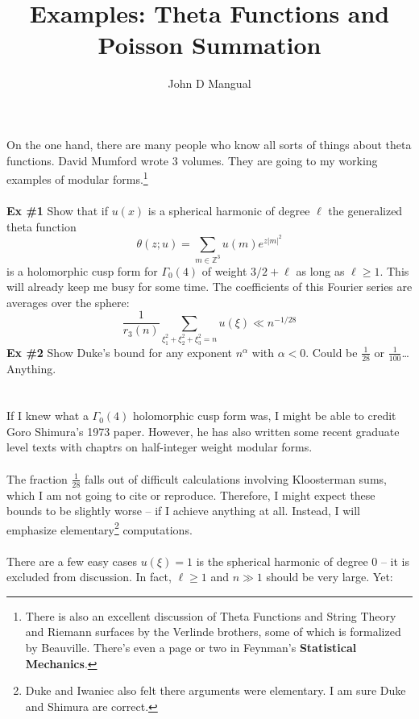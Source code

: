\documentclass[12pt]{article}
\title{\textbf{ Examples: Theta Functions and Poisson Summation}}
\author{John D Mangual}
\date{}
\begin{document}
\selectfont \fontsize{25}{30}\selectfont

\maketitle

\selectfont \fontsize{12}{10}\selectfont

\noindent On the one hand, there are many people who know all sorts of things about theta functions.  David Mumford wrote 3 volumes.  They are going to my working examples of modular forms.\footnote{There is also an excellent discussion of Theta Functions and String Theory and Riemann surfaces by the Verlinde brothers, some of which is formalized by Beauville.  There's even a page or two in Feynman's \textbf{Statistical Mechanics}. } \\ \\
\textbf{Ex \#1} Show that if $u(x)$ is a spherical harmonic of degree $\ell$ the generalized theta function
$$ \theta(z; u) = \sum_{m \in \mathbb{Z}^3} u(m) e^{z|m|^2} $$
is a holomorphic cusp form for $\Gamma_0(4)$ of weight $3/2 + \ell$ as long as $\ell \geq 1$.  This will already keep me busy for some time.  The coefficients of this Fourier series are averages over the sphere:
$$  \frac{1}{r_3(n)} \sum_{\xi_1^2 + \xi_2^2 + \xi_3^2 = n} u(\xi) \ll   n^{- 1/28}$$
\textbf{Ex \#2} Show Duke's bound for any exponent $n^\alpha$ with $\alpha < 0$.  Could be $\frac{1}{28}$ or $\frac{1}{100}$\dots Anything.  \\ \\ \\
If I knew what a $\Gamma_0(4)$ holomorphic cusp form was, I might be able to credit Goro Shimura's 1973 paper.  However, he has also written some recent graduate level texts with chaptrs on half-integer weight modular forms.  \\ \\ 
The fraction $\frac{1}{28}$ falls out of difficult calculations involving Kloosterman sums, which I am not going to cite or reproduce.  Therefore, I might expect these bounds to be slightly worse -- if I achieve anything at all.   Instead, I will emphasize elementary\footnote{Duke and Iwaniec also felt there arguments were elementary.  I am sure Duke and Shimura are correct.} computations.\\ \\ 
There are a few easy cases $u(\xi) = 1$ is the spherical harmonic of degree 0 -- it is excluded from discussion.  In fact, $\ell \geq 1$ and $n \gg 1$ should be very large.  Yet:
\end{document}
